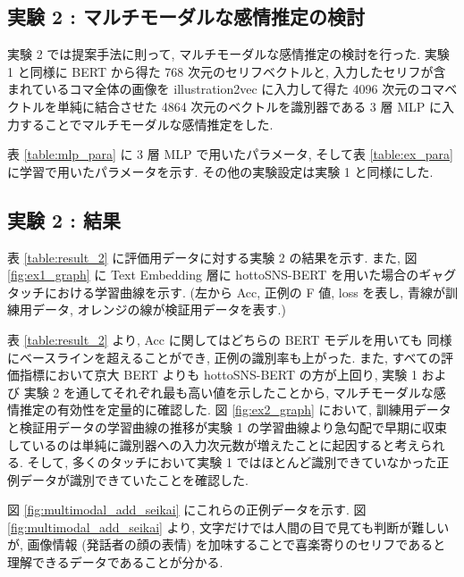 \newpage
\changeindent{0cm}
\subsection{実験 2 : マルチモーダルな感情推定の検討}
\changeindent{2cm}

実験 2 では提案手法に則って, マルチモーダルな感情推定の検討を行った.
実験 1 と同様に BERT から得た 768 次元のセリフベクトルと, 入力したセリフが含まれているコマ全体の画像を illustration2vec に入力して得た 4096 次元のコマベクトルを単純に結合させた 4864 次元のベクトルを識別器である 3 層 MLP に入力することでマルチモーダルな感情推定をした.

表 \ref{table:mlp_para} に 3 層 MLP で用いたパラメータ, そして表 \ref{table:ex_para} に学習で用いたパラメータを示す. その他の実験設定は実験 1 と同様にした.


\changeindent{0cm}
\subsection{実験 2 : 結果}
\changeindent{2cm}

表 \ref{table:result_2} に評価用データに対する実験 2 の結果を示す. また, 図 \ref{fig:ex1_graph} に Text Embedding 層に hottoSNS-BERT を用いた場合のギャグタッチにおける学習曲線を示す. (左から Acc, 正例の F 値, loss を表し, 青線が訓練用データ, オレンジの線が検証用データを表す.)

表 \ref{table:result_2} より, Acc に関してはどちらの BERT モデルを用いても
同様にベースラインを超えることができ, 正例の識別率も上がった. また, すべての評価指標において京大 BERT よりも hottoSNS-BERT の方が上回り, 実験 1 および 実験 2 を通してそれぞれ最も高い値を示したことから, マルチモーダルな感情推定の有効性を定量的に確認した. 図 \ref{fig:ex2_graph} において, 訓練用データと検証用データの学習曲線の推移が実験 1 の学習曲線より急勾配で早期に収束しているのは単純に識別器への入力次元数が増えたことに起因すると考えられる. そして, 多くのタッチにおいて実験 1 ではほとんど識別できていなかった正例データが識別できていたことを確認した.

図 \ref{fig:multimodal_add_seikai} にこれらの正例データを示す. 図 \ref{fig:multimodal_add_seikai} より, 文字だけでは人間の目で見ても判断が難しいが, 画像情報 (発話者の顔の表情) を加味することで喜楽寄りのセリフであると理解できるデータであることが分かる.

\newpage


